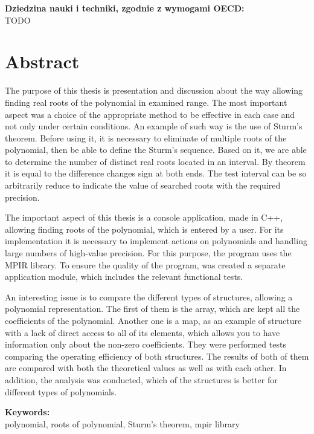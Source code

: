 \documentclass[oneside,a4paper]{book}
\begin{document}
	\vspace{12pt}
	\noindent\textbf{Dziedzina nauki i techniki, zgodnie z wymogami OECD:} \\
	TODO
	
	\chapter*{Abstract}
	
	The purpose of this thesis is presentation and discussion about the way allowing finding real roots of the polynomial in examined range. The most important aspect was a choice of the appropriate method to be effective in each case and not only under certain conditions. An example of such way is the use of Sturm’s theorem. Before using it, it is necessary to eliminate of multiple roots of the polynomial, then be able to define the Sturm’s sequence. Based on it, we are able to determine the number of distinct real roots located in an interval. By theorem it is equal to the difference changes sign at both ends. The test interval can be so arbitrarily reduce to indicate the value of searched roots with the required precision.
	
	The important aspect of this thesis is a console application, made in C++, allowing finding roots of the polynomial, which is entered by a user. For its implementation it is necessary to implement actions on polynomials and handling large numbers of high-value precision. For this purpose, the program uses the MPIR library. To ensure the quality of the program, was created a separate application module, which includes the relevant functional tests.
	
	An interesting issue is to compare the different types of structures, allowing a polynomial representation. The first of them is the array, which are kept all the coefficients of the polynomial. Another one is a map, as an example of structure with a lack of direct access to all of its elements, which allows you to have information only about the non-zero coefficients. They were performed tests comparing the operating efficiency of both structures. The results of both of them are compared with both the theoretical values as well as with each other. In addition, the analysis was conducted, which of the structures is better for different types of polynomials.

	\vspace{12pt}
	\noindent\textbf{Keywords: }\\
	polynomial, roots of polynomial, Sturm’s theorem, mpir library
\end{document}
